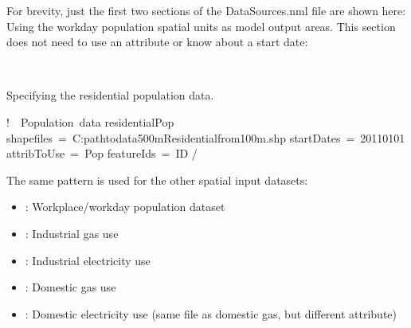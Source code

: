 \documentclass[letterpaper,10pt,english]{sphinxmanual}
\begin{document}
For brevity, just the first two sections of the DataSources.nml file are
shown here: Using the workday population spatial units as model output
areas. This section does not need to use an attribute or know about a
start date:

%
\begin{sphinxVerbatim}[commandchars=\\\{\}]
       
       
       
\end{sphinxVerbatim}

Specifying the residential population data.

%
\begin{sphinxVerbatim}[commandchars=\\\{\}]
! \PYGZsh{}\PYGZsh{}\PYGZsh{} Population data
\PYGZam{}residentialPop
   shapefiles = \PYGZsq{}C:\PYGZbs{}path\PYGZbs{}to\PYGZbs{}data\PYGZbs{}500m\PYGZus{}Residential\PYGZus{}from\PYGZus{}100m.shp\PYGZsq{}
   startDates = \PYGZsq{}2011\PYGZhy{}01\PYGZhy{}01\PYGZsq{}
   attribToUse = \PYGZsq{}Pop\PYGZsq{}
   featureIds = \PYGZsq{}ID\PYGZsq{}
/
\end{sphinxVerbatim}

The same pattern is used for the other spatial input datasets:
\begin{itemize}
\item {} 
: Workplace/workday population dataset

\item {} 
: Industrial gas use

\item {} 
: Industrial electricity use

\item {} 
: Domestic gas use

\item {} 
: Domestic electricity use (same file as domestic
gas, but different attribute)

\end{itemize}
\end{document}
